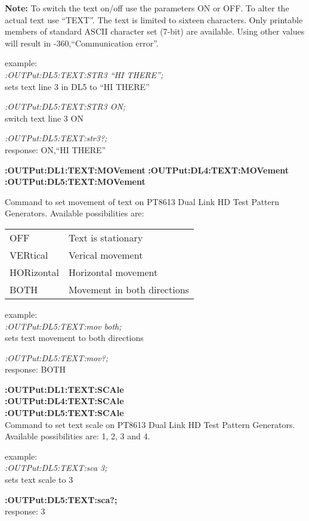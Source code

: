 \textbf{Note:} To switch the text on/off use the parameters ON or OFF. To alter the actual text use ``TEXT''.  The text is limited to sixteen characters.  Only printable members of standard ASCII character set (7-bit) are available.  Using other values will result in -360,``Communication error''.

example:\\
\textit{:OUTPut:DL5:TEXT:STR3 ``HI THERE'';}\\
sets text line 3 in DL5 to ``HI THERE''

\textit{:OUTPut:DL5:TEXT:STR3 ON;}\\
switch text line 3 ON

\textit{:OUTPut:DL5:TEXT:str3?;}\\
response: ON,``HI THERE''

\textbf{:OUTPut:DL1:TEXT:MOVement}
\textbf{:OUTPut:DL4:TEXT:MOVement}
\textbf{:OUTPut:DL5:TEXT:MOVement}

Command to set movement of text on PT8613 Dual Link HD Test Pattern Generators. Available possibilities are:

\begin{tabular}{l l}

OFF         & Text is stationary\\
VERtical    & Verical movement\\
HORizontal  & Horizontal movement\\
BOTH        & Movement in both directions \\
\end{tabular}

example:\\
\textit{:OUTPut:DL5:TEXT:mov both; }\\
sets text movement to both directions

\textit{:OUTPut:DL5:TEXT:mov?;}\\
response: BOTH

\textbf{:OUTPut:DL1:TEXT:SCAle}\\
\textbf{:OUTPut:DL4:TEXT:SCAle}\\
\textbf{:OUTPut:DL5:TEXT:SCAle}\\

Command to set text scale on PT8613 Dual Link HD Test Pattern Generators. Available possibilities are: 1, 2, 3 and 4.

example:\\
\textit{:OUTPut:DL5:TEXT:sca 3;}\\
sets text scale to 3

\textbf{:OUTPut:DL5:TEXT:sca?; }\\
response: 3

